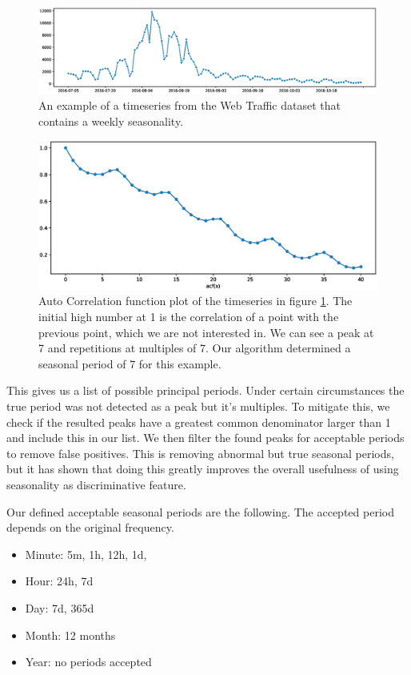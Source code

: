 \begin{figure}
\centerline{\includegraphics[scale=.4]{Figures/ts_example.eps}}
\caption{An example of a timeseries from the Web Traffic dataset that contains a weekly seasonality.}
\label{fig:ts_example}
\end{figure}

\begin{figure}
\centerline{\includegraphics[scale=.5]{Figures/acf.eps}}
\caption{Auto Correlation function plot of the timeseries in figure \ref{fig:ts_example}. The initial high number at 1 is the correlation of a point with the previous point, which we are not interested in. We can see a peak at 7 and repetitions at multiples of 7. Our algorithm determined a seasonal period of 7 for this example.}
\label{fig:acf}
\end{figure}

This gives us a list of possible principal periods. Under certain circumstances the true period was not detected as a peak but it's multiples. To mitigate this, we check if the resulted peaks have a greatest common denominator larger than 1 and include this in our list. We then filter the found peaks for acceptable periods to remove false positives. This is removing abnormal but true seasonal periods, but it has shown that doing this greatly improves the overall usefulness of using seasonality as discriminative feature.

\newpage
Our defined acceptable seasonal periods are the following. The accepted period depends on the original frequency.

\begin{itemize}
    \item Minute: 5m, 1h, 12h, 1d,
    \item Hour: 24h, 7d
    \item Day: 7d, 365d
    \item Month: 12 months
    \item Year: no periods accepted
\end{itemize}

